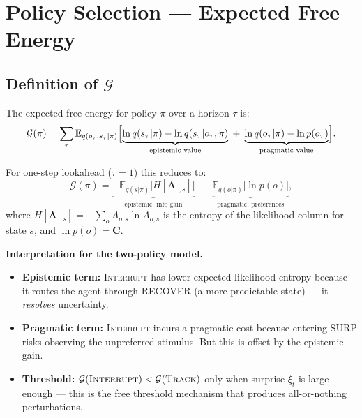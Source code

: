 \documentclass[11pt, a4paper]{article}
\newcommand{\mat}[1]{\mathbf{#1}}
\newcommand{\EFE}{\mathcal{G}}
\begin{document}
\section{Policy Selection — Expected Free Energy}
\label{sec:efe}

\subsection{Definition of $\EFE$}
The expected free energy for policy $\pi$ over a horizon $\tau$ is:
\begin{equation}
  \EFE(\pi) = \sum_{\tau} \mathbb{E}_{q(o_\tau,s_\tau|\pi)}
  \Bigl[\underbrace{\ln q(s_\tau|\pi) - \ln q(s_\tau|o_\tau,\pi)}_{\text{epistemic value}}
  \;+\; \underbrace{\ln q(o_\tau|\pi) - \ln p(o_\tau)}_{\text{pragmatic value}}\Bigr].
  \label{eq:efe_full}
\end{equation}

For one-step lookahead ($\tau=1$) this reduces to:
\begin{equation}
  \EFE(\pi)
  = \underbrace{-\mathbb{E}_{q(s|\pi)}\bigl[H[\mat{A}_{:,s}]\bigr]}_{\text{epistemic: info gain}}
  \;-\; \underbrace{\mathbb{E}_{q(o|\pi)}\bigl[\ln p(o)\bigr]}_{\text{pragmatic: preferences}},
  \label{eq:efe_decomp}
\end{equation}
where $H[\mat{A}_{:,s}] = -\sum_o A_{o,s}\ln A_{o,s}$ is the entropy of
the likelihood column for state $s$, and $\ln p(o) = \mat{C}$.

\begin{keybox}
\textbf{Interpretation for the two-policy model.}
\begin{itemize}[noitemsep]
  \item \textbf{Epistemic term:} \textsc{Interrupt} has lower expected
        likelihood entropy because it routes the agent through RECOVER
        (a more predictable state) — it \emph{resolves} uncertainty.
  \item \textbf{Pragmatic term:} \textsc{Interrupt} incurs a pragmatic
        cost because entering SURP risks observing the unpreferred stimulus.
        But this is offset by the epistemic gain.
  \item \textbf{Threshold:}
        $\EFE(\textsc{Interrupt}) < \EFE(\textsc{Track})$ only when
        surprise $\xi_t$ is large enough — this is the free threshold
        mechanism that produces all-or-nothing perturbations.
\end{itemize}
\end{keybox}
\end{document}
